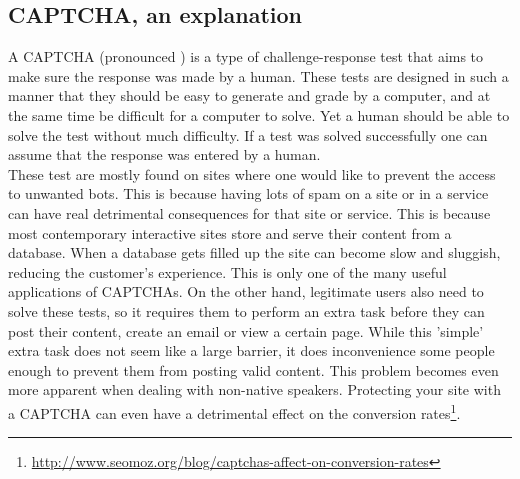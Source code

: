 \documentclass[pdftex,a4paper,12pt,twoside]{report}
\theoremstyle{plain} \newtheorem{theorem}{Theorem} \newtheorem{proposition}{Proposition} \newtheorem{lemma}{Lemma} \newtheorem*{corollary}{Corollary}
\theoremstyle{definition} \newtheorem{definition}{Definition} \newtheorem{conjecture}{Conjecture} \newtheorem*{example}{Example} \newtheorem{algorithm}{Algorithm}
\theoremstyle{remark} \newtheorem*{remark}{Remark} \newtheorem*{note}{Note} \newtheorem{case}{Case}
\begin{document}
\subsection{CAPTCHA, an explanation}
A CAPTCHA (pronounced %
) is a type of challenge-response test that aims to make sure the response was made by a human. These tests are designed in such a manner that they should be easy to generate and grade by a computer, and at the same time be difficult for a computer to solve. Yet a human should be able to solve the test without much difficulty. If a test was solved successfully one can assume that the response was entered by a human.\\
These test are mostly found on sites where one would like to prevent the access to unwanted bots. This is because having lots of spam on a site or in a service can have real detrimental consequences for that site or service. This is because most contemporary interactive sites store and serve their content from a database. When a database gets filled up the site can become slow and sluggish, reducing the customer's experience. This is only one of the many useful applications of CAPTCHAs. On the other hand, legitimate users also need to solve these tests, so it requires them to perform an extra task before they can post their content, create an email or view a certain page. While this 'simple' extra task does not seem like a large barrier, it does inconvenience some people enough to prevent them from posting valid content. This problem becomes even more apparent when dealing with non-native speakers\citep{Banday2011}. Protecting your site with a CAPTCHA can even have a detrimental effect on the conversion rates\footnote{\url{http://www.seomoz.org/blog/captchas-affect-on-conversion-rates}}.
\end{document}
